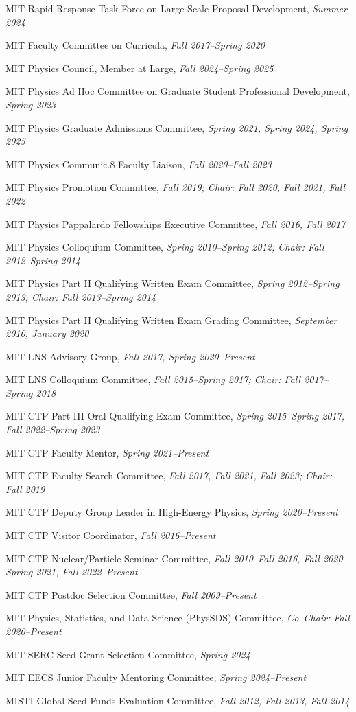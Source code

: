\bbl
\item MIT Rapid Response Task Force on Large Scale Proposal Development, \emph{Summer 2024}
\item MIT Faculty Committee on Curricula, \emph{Fall 2017--Spring 2020}
\item MIT Physics Council, Member at Large, \emph{Fall 2024--Spring 2025}
\item MIT Physics Ad Hoc Committee on Graduate Student Professional Development, \emph{Spring 2023}
\item MIT Physics Graduate Admissions Committee, \emph{Spring 2021, Spring 2024, Spring 2025}
\item MIT Physics Communic.8 Faculty Liaison, \emph{Fall 2020--Fall 2023}
\item MIT Physics Promotion Committee, \emph{Fall 2019; Chair: Fall 2020, Fall 2021, Fall 2022}
\item MIT Physics Pappalardo Fellowships Executive Committee, \emph{Fall 2016, Fall 2017}
\item MIT Physics Colloquium Committee, \emph{Spring 2010--Spring 2012; Chair: Fall 2012--Spring 2014}
\item MIT Physics Part II Qualifying Written Exam Committee, \emph{Spring 2012--Spring 2013; Chair: Fall 2013--Spring 2014}
\item MIT Physics Part II Qualifying Written Exam Grading Committee, \emph{September 2010, January 2020}
\item MIT LNS Advisory Group, \emph{Fall 2017, Spring 2020--Present}
\item MIT LNS Colloquium Committee, \emph{Fall 2015--Spring 2017; Chair: Fall 2017--Spring 2018}
\item MIT CTP Part III Oral Qualifying Exam Committee, \emph{Spring 2015--Spring 2017, Fall 2022--Spring 2023}
\item MIT CTP Faculty Mentor, \emph{Spring 2021--Present}
\item MIT CTP Faculty Search Committee, \emph{Fall 2017, Fall 2021, Fall 2023; Chair: Fall 2019}
\item MIT CTP Deputy Group Leader in High-Energy Physics, \emph{Spring 2020--Present}
\item MIT CTP Visitor Coordinator, \emph{Fall 2016--Present}
\item MIT CTP Nuclear/Particle Seminar Committee, \emph{Fall 2010--Fall 2016, Fall 2020--Spring 2021, Fall 2022--Present}
\item MIT CTP Postdoc Selection Committee, \emph{Fall 2009--Present}
\item MIT Physics, Statistics, and Data Science (PhysSDS) Committee, \emph{Co--Chair: Fall 2020--Present}
\item MIT SERC Seed Grant Selection Committee, \emph{Spring 2024}
\item MIT EECS Junior Faculty Mentoring Committee, \emph{Spring 2024--Present}
\item MISTI Global Seed Funds Evaluation Committee, \emph{Fall 2012, Fall 2013, Fall 2014}
\el
